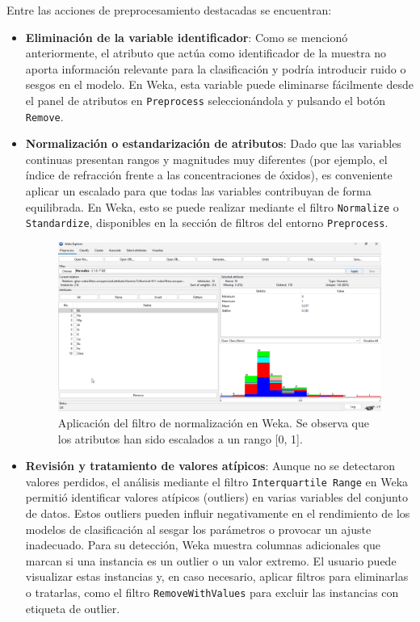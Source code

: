 \documentclass{article}
\begin{document}
Entre las acciones de preprocesamiento destacadas se encuentran:

\begin{itemize}
    \item \textbf{Eliminación de la variable identificador}: Como se mencionó anteriormente, el atributo que actúa como identificador de la muestra no aporta información relevante para la clasificación y podría introducir ruido o sesgos en el modelo. En Weka, esta variable puede eliminarse fácilmente desde el panel de atributos en \texttt{Preprocess} seleccionándola y pulsando el botón \texttt{Remove}.\\
    
    \item \textbf{Normalización o estandarización de atributos}: Dado que las variables continuas presentan rangos y magnitudes muy diferentes (por ejemplo, el índice de refracción frente a las concentraciones de óxidos), es conveniente aplicar un escalado para que todas las variables contribuyan de forma equilibrada. En Weka, esto se puede realizar mediante el filtro \texttt{Normalize} o \texttt{Standardize}, disponibles en la sección de filtros del entorno \texttt{Preprocess}.\\
    
    \begin{figure}[!ht]
        \centering
        \includegraphics[width=1\linewidth]{Imágenes/normalization.png}
        \caption{Aplicación del filtro de normalización en Weka. Se observa que los atributos han sido escalados a un rango [0, 1].}
        \label{fig:normalization}
    \end{figure}
    
    \item \textbf{Revisión y tratamiento de valores atípicos}: Aunque no se detectaron valores perdidos, el análisis mediante el filtro \texttt{Interquartile Range} en Weka permitió identificar valores atípicos (outliers) en varias variables del conjunto de datos. Estos outliers pueden influir negativamente en el rendimiento de los modelos de clasificación al sesgar los parámetros o provocar un ajuste inadecuado. Para su detección, Weka muestra columnas adicionales que marcan si una instancia es un outlier o un valor extremo. El usuario puede visualizar estas instancias y, en caso necesario, aplicar filtros para eliminarlas o tratarlas, como el filtro \texttt{RemoveWithValues} para excluir las instancias con etiqueta de outlier.
    

\end{itemize}
\end{document}
